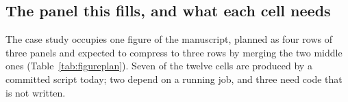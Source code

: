 \subsection{The panel this fills, and what each cell needs}
\label{sec:figure}

The case study occupies one figure of the manuscript, planned as four rows of three
panels and expected to compress to three rows by merging the two middle ones
(Table~\ref{tab:figureplan}). Seven of the twelve cells are produced by a committed
script today; two depend on a running job, and three need code that is not written.

